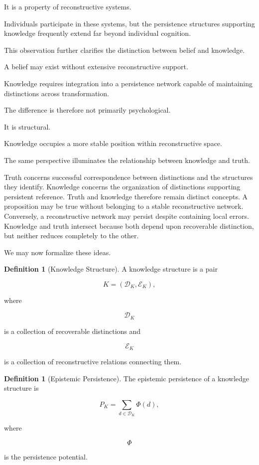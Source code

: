 \documentclass[12pt,oneside]{article}
\theoremstyle{definition}
\newtheorem{definition}[theorem]{Definition} \newtheorem{axiom}[theorem]{Axiom} \newtheorem{remark}[theorem]{Remark} \newtheorem{example}[theorem]{Example}
\begin{document}
It is a property of reconstructive systems.

Individuals participate in these systems, but the persistence structures supporting knowledge frequently extend far beyond individual cognition.

This observation further clarifies the distinction between belief and knowledge.

A belief may exist without extensive reconstructive support.

Knowledge requires integration into a persistence network capable of maintaining distinctions across transformation.

The difference is therefore not primarily psychological.

It is structural.

Knowledge occupies a more stable position within reconstructive space.

The same perspective illuminates the relationship between knowledge and truth.

Truth concerns successful correspondence between distinctions and the structures they identify. Knowledge concerns the organization of distinctions supporting persistent reference. Truth and knowledge therefore remain distinct concepts. A proposition may be true without belonging to a stable reconstructive network. Conversely, a reconstructive network may persist despite containing local errors. Knowledge and truth intersect because both depend upon recoverable distinction, but neither reduces completely to the other.

We may now formalize these ideas.

\begin{definition}[Knowledge Structure]

A knowledge structure is a pair

\[
K=(\mathcal D_K,\mathcal E_K),
\]

where

\[
\mathcal D_K
\]

is a collection of recoverable distinctions and

\[
\mathcal E_K
\]

is a collection of reconstructive relations connecting them.

\end{definition}

\begin{definition}[Epistemic Persistence]

The epistemic persistence of a knowledge structure is

\[
P_K
=
\sum_{d\in\mathcal D_K}
\Phi(d),
\]

where

\[
\Phi
\]

is the persistence potential.

\end{definition}
\end{document}
